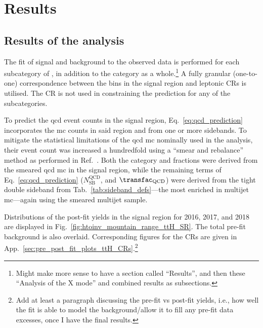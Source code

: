 \section{Results}
\label{sec:htoinv_results}

\subsection{Results of the \texorpdfstring{\ttH}{ttH} analysis}
\label{subsec:htoinv_analysis_ttH}

The fit of signal and background to the observed data is performed for each subcategory of \ttH, in addition to the category as a whole.\footnote{Might make more sense to have a section called ``Results'', and then these ``Analysis of the X mode'' and combined results as subsections.} A fully granular (one-to-one) correspondence between the bins in the signal region and leptonic \glspl{CR} is utilised. The \singlePhotonCr \gls{CR} is not used in constraining the \ztonunu prediction for any of the subcategories.

To predict the \acrshort{qcd} event counts in the signal region, Eq.~\ref{eq:qcd_prediction} incorporates the \acrshort{mc} counts in said region and from one or more sidebands. To mitigate the statistical limitations of the \acrshort{qcd} \acrshort{mc} nominally used in the analysis, their event count was increased a hundredfold using a ``smear and rebalance'' method as performed in Ref.~. Both the category and \ptmiss fractions were derived from the smeared \acrshort{qcd} \acrshort{mc} in the signal region, while the remaining terms of Eq.~\ref{eq:qcd_prediction} ($N_{\mathrm{SB}}^{\mathrm{QCD}}$, and $\transfac_{\mathrm{QCD}}$) were derived from the tight double sideband from Tab.~\ref{tab:sideband_defs}---the most enriched in multijet \acrshort{mc}---again using the smeared multijet sample.

Distributions of the post-fit yields in the signal region for 2016, 2017, and 2018 are displayed in Fig.~\ref{fig:htoinv_mountain_range_ttH_SR}. The total pre-fit background is also overlaid. Corresponding figures for the \glspl{CR} are given in App.~\ref{sec:pre_post_fit_plots_ttH_CRs}.\footnote{Add at least a paragraph discussing the pre-fit vs post-fit yields, i.e., how well the fit is able to model the background/allow it to fill any pre-fit data excesses, once I have the final results.}

